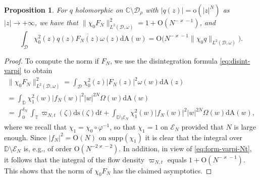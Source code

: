 \documentclass{amsart}
\newcommand{\be}{\begin{equation}}
\newcommand{\ee}{\end{equation}}
\newcommand{\C}{\mathbb{C}}
\newcommand{\D}{\mathbb{D}}
\newcommand{\T}{\mathbb{T}}
\newcommand{\calD}{\mathcal{D}}
\newcommand{\calE}{\mathcal{E}}
\newcommand{\diffA}{\mathrm{dA}}
\newcommand{\diffs}{\mathrm{ds}}
\newcommand{\diff}{\mathrm{d}}
\newtheorem{prop}[thm]{Proposition}
\theoremstyle{definition}
\theoremstyle{remark}
\newcommand{\Ordo}{\mathrm{O}}
\newcommand{\ordo}{\mathrm{o}}
\numberwithin{equation}{subsection}
\begin{document}
\begin{prop}\label{prop:flow-conseq}
For $q$ holomorphic on $\C\setminus \calD_\rho$ with $|q(z)|=
\ordo(|z|^{N})$ as $|z|\to+\infty$, we have that 
$\lVert \chi_0 F_N\rVert_{L^2(\calD,\omega)}^2=1+\Ordo(N^{-\varkappa-1})$, 
and
\be\label{eq:flow-conseq}
\int_{\calD}\chi_0^2(z)q(z)\overline{F_N(z)}\omega(z)\diffA(w)
=\Ordo\big(N^{-\varkappa-1}\lVert \chi_0 q\rVert_{L^2(\calD,\omega)}\big).
\ee
\end{prop}
\begin{proof}
To compute the norm if $F_N$, we use the disintegration formula
\eqref{eq:disint-varpi} to obtain
\begin{multline}
\lVert \chi_0 F_N\rVert_{L^2(\calD,\omega)}^2
=\int_{\calD}\chi_0^2(z)|F_N(z)|^2\omega(w)\diffA(z)
\\
=\int_\D\chi_1^2(w)|f_N(w)|^2|w|^{2N}\Omega(w)\diffA(w)
\\=\int_{0}^{\delta_N}\int_\T\varpi_{N,t}(\zeta)\diffs(\zeta)\diff t + 
\int_{\D\setminus\calE_N}\chi_1^2(w)|f_N(w)|^2|w|^{2N}\Omega(w)\diffA(w),
\end{multline}
where we recall that $\chi_1=\chi_0\circ\varphi^{-1}$, so that
$\chi_1=1$ on $\calE_N$ provided that $N$ is large enough.
Since $|f_N|^2=\Ordo(N)$ on $\mathrm{supp}(\chi_1)$ it is clear that 
the integral over $\D\setminus\calE_N$ is, e.g., of order $\Ordo(N^{-2\varkappa-2})$.
In addition, in view of \eqref{eq:form-varpi-Nt}, it follows that the integral
of the flow density $\varpi_{N,t}$ equals $1+\Ordo(N^{-\varkappa-1})$.
This shows that the norm of $\chi_0 F_N$ has the claimed asymptotics.


\end{proof}
\end{document}
